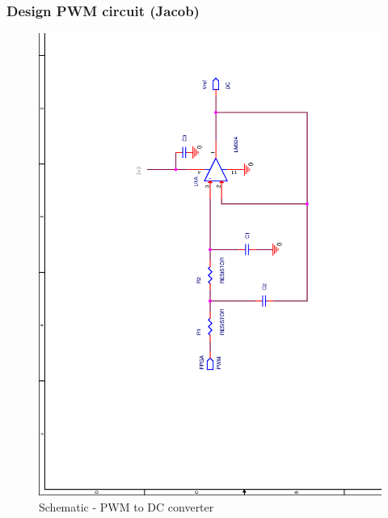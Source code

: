\subsubsection{Design PWM circuit (Jacob)}
\begin{figure}[htbp]
\hspace*{-3cm}
\centering
\includegraphics[width=13cm]{./img/SCHEMATIC1_PWM_DC}
\caption{Schematic - PWM to DC converter}
\label{fig:SCHEMATIC1_PWM_DC}
\end{figure}
